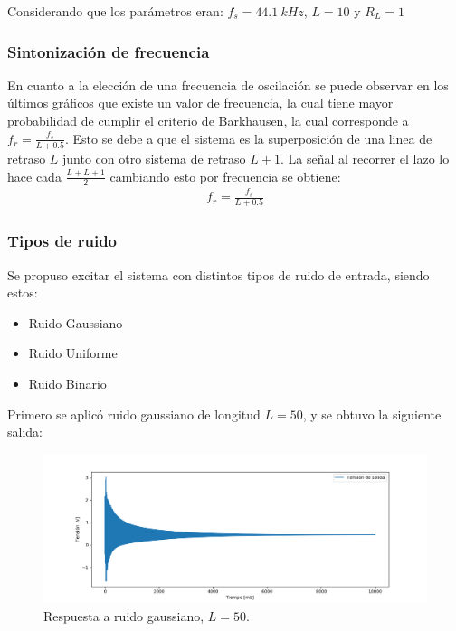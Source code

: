 Considerando que los parámetros eran: $f_s = 44.1 \ kHz$, $L=10$ y $R_L=1$

\subsubsection{Sintonización de frecuencia}
En cuanto a la elección de una frecuencia de oscilación se puede observar en los últimos gráficos que existe un valor de frecuencia, la cual tiene mayor probabilidad de cumplir el criterio de Barkhausen, la cual corresponde a $f_r = \frac{f_s}{L+0.5}$. Esto se debe a que el sistema es la superposición de una linea de retraso $L$ junto con otro sistema de retraso $L+1$. La señal al recorrer el lazo lo hace cada $\frac{L+L+1}{2}$ cambiando esto por frecuencia se obtiene:
\begin{align}
	f_r=\frac{f_s}{L+0.5}
	\label{eq:fr}
\end{align}

\subsubsection{Tipos de ruido}
Se propuso excitar el sistema con distintos tipos de ruido de entrada, siendo estos:
\begin{itemize}
\item Ruido Gaussiano
\item Ruido Uniforme
\item Ruido Binario
\end{itemize}

Primero se aplicó ruido gaussiano de longitud $L=50$, y se obtuvo la siguiente salida:
\begin{figure}[H]
	\centering
	\includegraphics[width=\textwidth]{ImagenesEjercicio4/gaussianResponse.PNG}
\caption{Respuesta a ruido gaussiano, $L=50$.}
	\label{fig:gaussiano}
\end{figure}

